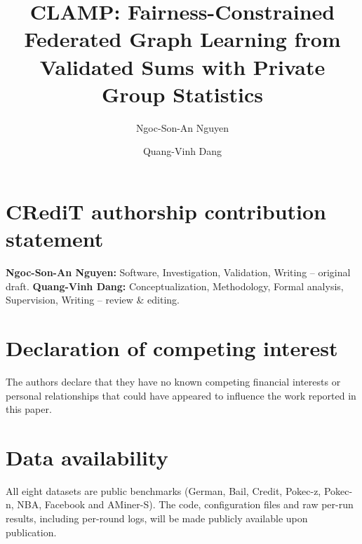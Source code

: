 \documentclass[preprint,12pt]{elsarticle}
\theoremstyle{plain}
\theoremstyle{definition}
\theoremstyle{remark}
\begin{document}
\begin{frontmatter}

\title{CLAMP: Fairness-Constrained Federated Graph Learning from Validated Sums with Private Group Statistics}

\author[inst1]{Ngoc-Son-An Nguyen}

\author[inst2]{Quang-Vinh Dang}





\end{frontmatter}











\section*{CRediT authorship contribution statement}
\textbf{Ngoc-Son-An Nguyen:} Software, Investigation, Validation, Writing -- original draft.
\textbf{Quang-Vinh Dang:} Conceptualization, Methodology, Formal analysis, Supervision, Writing -- review \& editing.

\section*{Declaration of competing interest}
The authors declare that they have no known competing financial interests or personal relationships that could have appeared to influence the work reported in this paper.

\section*{Data availability}
All eight datasets are public benchmarks (German, Bail, Credit, Pokec-z, Pokec-n, NBA, Facebook and AMiner-S). The code, configuration files and raw per-run results, including per-round logs, will be made publicly available upon publication.

\appendix




\end{document}
